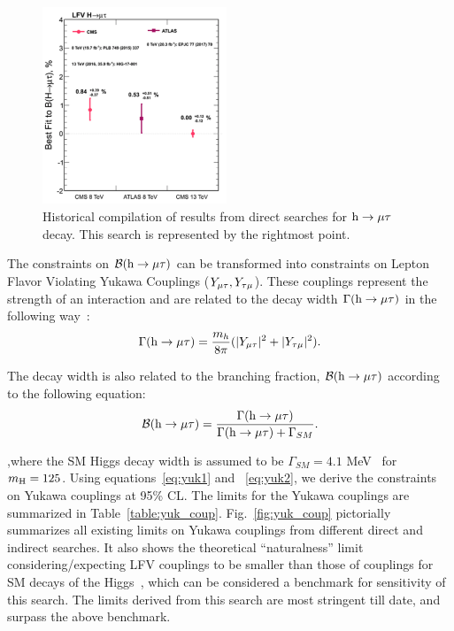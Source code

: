 \begin{figure}[!htpb]\centering
 \includegraphics[width=0.49\textwidth]{plots_and_figures/chapter8/h125/hist_limit.png}
 \caption{Historical compilation of results from direct searches for $\text{h} \to \mu \tau$ decay. This search is represented by the rightmost point.}
 \label{fig:hist_limits}
\end{figure}


The constraints on $\mathcal{B}(\text{h} \to \mu \tau)$ can be transformed into constraints on Lepton Flavor Violating Yukawa Couplings ($Y_{\mu\tau},Y_{\tau\mu}$). These couplings represent the strength of an interaction and are related to the decay width $\Gamma(\text{h} \to \mu \tau)$ in the following way~\cite{Harnik:2012pb}:
\begin{equation}                                                                                                                                                                                                 
\Gamma(\text{h} \to \mu \tau)=\frac{m_{h}}{8\pi}(|Y_{\mu\tau}|^2 + |Y_{\tau\mu}|^2).                                                          
\label{eq:yuk1}
\end{equation}

The decay width is also related to the branching fraction, $\mathcal{B}(\text{h} \to \mu \tau)$ according to the following equation:
\begin{equation}                                                                                                                                                                                                \mathcal{B}(\text{h} \to \mu \tau)=\frac{\Gamma(\text{h} \to \mu \tau)}{\Gamma(\text{h} \to \mu \tau) + \Gamma_{SM}}.
\label{eq:yuk2}
\end{equation}

,where the SM Higgs decay width is assumed to be $\Gamma_{SM}=4.1$ MeV~\cite{Denner:2011mq} for $m_{\text{H}}=125$\GeV. Using equations~\ref{eq:yuk1} and ~\ref{eq:yuk2}, we derive the constraints on Yukawa couplings at 95\% CL. The limits for the Yukawa couplings are summarized in Table~\ref{table:yuk_coup}. Fig.~\ref{fig:yuk_coup} pictorially summarizes all existing limits on Yukawa couplings from different direct and indirect searches. It also shows the theoretical ``naturalness'' limit considering/expecting LFV couplings to be smaller than those of couplings for SM decays of the Higgs~\cite{Harnik:2012pb}, which can be considered a benchmark for sensitivity of this search. The limits derived from this search are most stringent till date, and surpass the above benchmark. 

